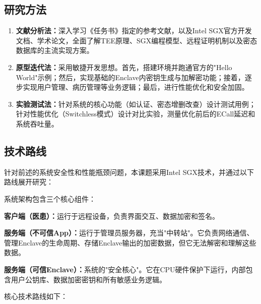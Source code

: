 \documentclass{article}
\begin{document}
\subsection*{研究方法}
\begin{enumerate}[leftmargin=*, label=\arabic*、]
  \item \textbf{文献分析法：}深入学习《任务书》指定的参考文献，以及Intel SGX官方开发文档、学术论文，全面了解TEE原理、SGX编程模型、远程证明机制以及密态数据库的主流实现方案。
  
  \item \textbf{原型迭代法：}采用敏捷开发思想。首先，搭建环境并跑通官方的"Hello World"示例；然后，实现基础的Enclave内密钥生成与加解密功能；接着，逐步实现用户管理、病历管理等业务逻辑；最后，进行性能优化和安全加固。
  
  \item \textbf{实验测试法：}针对系统的核心功能（如认证、密态增删改查）设计测试用例；针对性能优化（Switchless模式）设计对比实验，测量优化前后的ECall延迟和系统吞吐量。
\end{enumerate}

\subsection*{技术路线}
\noindent 针对前述的系统安全性和性能瓶颈问题，本课题采用Intel SGX技术，并通过以下路线展开研究：

系统架构包含三个核心组件：

\textbf{客户端（医患）：}运行于远程设备，负责界面交互、数据加密和签名。

\textbf{服务端（不可信App）：}运行于管理员服务器，充当"中转站"。它负责网络通信、管理Enclave的生命周期、存储Enclave输出的加密数据，但它无法解密和理解这些数据。

\textbf{服务端（可信Enclave）：}系统的"安全核心"。它在CPU硬件保护下运行，内部包含用户公钥库、数据加密密钥和所有敏感业务逻辑。

核心技术路线如下：
\end{document}

